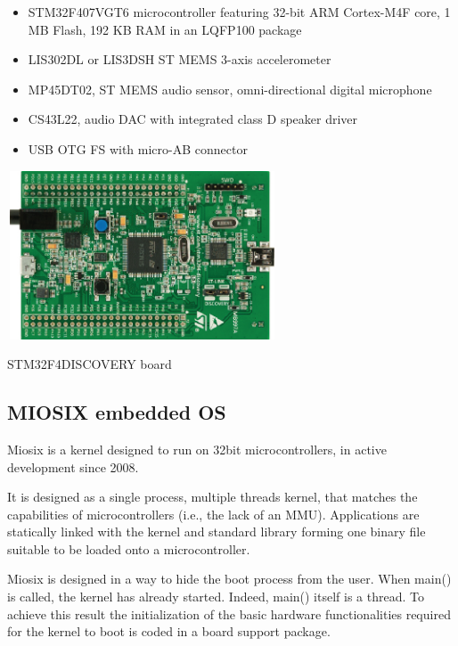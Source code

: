 \documentclass[a4paper,10pt]{article}
\makeatletter
\newenvironment{figurehere}{\def\@captype{figure}\vspace{2ex}}{\vspace{2ex}}
\makeatother
\begin{document}
\begin{multicols}{2}
{\small
\begin{itemize}
\item STM32F407VGT6 microcontroller featuring 32-bit ARM Cortex-M4F core, 1 MB Flash, 192 KB RAM in an LQFP100 package
\item LIS302DL or LIS3DSH ST MEMS 3-axis accelerometer
\item MP45DT02, ST MEMS audio sensor, omni-directional digital microphone
\item CS43L22, audio DAC with integrated class D speaker driver
\item USB OTG FS with micro-AB connector
\end{itemize}
}
\begin{figurehere}
 \centering
 \includegraphics[width=8cm, height=5cm]{./eps/STM32F4.eps}
 \caption{STM32F4DISCOVERY board}
 \label{fig:STM32F4}
\end{figurehere}

\subsection{MIOSIX embedded OS}

Miosix is a kernel designed to run on 32bit microcontrollers, in active development since 2008.

It is designed as a single process, multiple threads kernel, that matches the capabilities of microcontrollers (i.e., the lack of an MMU). Applications are statically linked with the kernel and standard library forming one binary file suitable to be loaded onto a microcontroller.

Miosix is designed in a way to hide the boot process from the user. When main() is called, the kernel has already started. Indeed, main() itself is a thread. To achieve this result the initialization of the basic hardware functionalities required for the kernel to boot is coded in a board support package.


\end{multicols}
\end{document}
